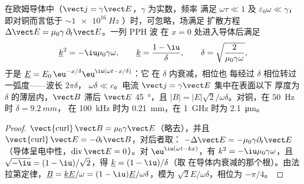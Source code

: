 \begin{theorem}[趋肤效应]\label{thm:b2:waves-in-media:skin}
在欧姆导体中（$\vect j = \gamma\vect E$，$\gamma$ 为实数，频率
满足 $\omega\tau \ll 1$ 及 $\varepsilon_0\omega \ll \gamma$，即对铜而言低于 $\sim\qty{1e16}{Hz}$
）时，可忽略，场满足
扩散方程 $\Delta\vect E = \mu_0\gamma\,\partial_t\vect E$。一列 PPH 波
在 $x = 0$ 处进入导体后满足
\[
\underline k^2 = -\iu\mu_0\gamma\omega , \qquad \underline k = \frac{1 - \iu}\delta , \qquad
\delta = \sqrt{\frac2{\mu_0\gamma\omega}} ,
\]
于是 $\underline E = E_0\,\eu^{-x/\delta}\eu^{\iu(\omega t - x/\delta)}$：它
在\emph{} $\delta$ 内衰减，相位也
每经过 $\delta$ 相位转过一弧度——波长 $2\pi\delta$， $\omega\delta \ll
c$。电流 $\vect j = \gamma\vect E$ 集中在表面以下
厚度为 $\delta$ 的薄层内，$\vect B$ 滞后 $\vect E$ \qty{45}{\degree}，且
$|B| = |E|\sqrt2/\omega\delta$。对铜，在 \qty{50}{Hz} 时 $\delta = \qty{9.2}{mm}$，
在 \qty{100}{kHz} 时为 \qty{0.21}{mm}，在 \qty{1}{GHz} 时为 \qty{2.1}{\micro m}。
\end{theorem}

\begin{proof}
$\operatorname{\vect{curl}}\vect B = \mu_0\gamma\vect E$（略去），并且
$\operatorname{\vect{curl}}\vect E = -\partial_t\vect B$，对后者取：
$-\Delta\vect E = -\mu_0\gamma\partial_t\vect E$（导体呈电中性，$\operatorname{div}
\vect E = 0$）。对 $\eu^{\iu(\omega t - kx)}$，有 $k^2 = -\iu\mu_0\gamma\omega$，且
$\sqrt{-\iu} = (1 - \iu)/\sqrt2$，得 $\underline k = (1 - \iu)/\delta$（取
在导体内衰减的那个根）。由法拉第定律，$\underline B = \underline k\underline E/\omega = (1 - \iu)
\underline E/\omega\delta$，模为 $\sqrt2E/\omega\delta$，相位为 $-\pi/4$。
\end{proof}

